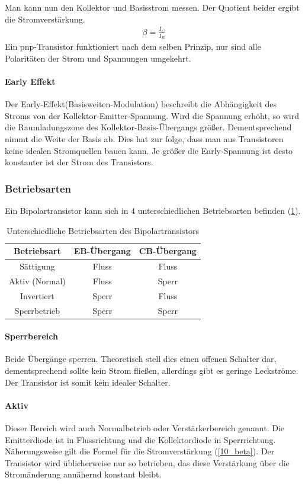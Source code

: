 	Man kann nun den Kollektor und Basisstrom messen. Der Quotient beider ergibt die Stromverstärkung.
	\begin{align}
		\beta = \frac{I_C}{I_B}
		\label{10_beta}
	\end{align}
	Ein pnp-Transistor funktioniert nach dem selben Prinzip, nur sind alle Polaritäten der Strom und Spannungen umgekehrt.
	
	\paragraph{Early Effekt} Der Early-Effekt(Basisweiten-Modulation) beschreibt die Abhängigkeit des Stroms von der Kollektor-Emitter-Spannung. Wird die Spannung erhöht, so wird die Raumladungszone des Kollektor-Basis-Übergangs größer. Dementsprechend nimmt die Weite der Basis ab. Dies hat zur folge, dass man aus Transistoren keine idealen Stromquellen bauen kann. Je größer die Early-Spannung ist desto konstanter ist der Strom des Transistors.
	
	\subsubsection{Betriebsarten}
	Ein Bipolartransistor kann sich in 4 unterschiedlichen Betriebsarten befinden (\ref{10_betriebsarten}).
	\begin{table}[h]
		\centering
		\begin{tabular}{c|c|c}
			Betriebsart& EB-Übergang &CB-Übergang\\
			\hline
			Sättigung & Fluss & Fluss\\
			Aktiv (Normal) & Fluss & Sperr\\
			Invertiert & Sperr & Fluss\\
			Sperrbetrieb & Sperr & Sperr
		\end{tabular}
		\caption{Unterschiedliche Betriebsarten des Bipolartransistors}
		\label{10_betriebsarten}
	\end{table}
	\paragraph{Sperrbereich} Beide Übergänge sperren. Theoretisch stell dies einen offenen Schalter dar, dementsprechend sollte kein Strom fließen, allerdings gibt es geringe Leckströme. Der Transistor ist somit kein idealer Schalter.
	\paragraph{Aktiv} Dieser Bereich wird auch Normalbetrieb oder Verstärkerbereich genannt. Die Emitterdiode ist in Flussrichtung und die Kollektordiode in Sperrrichtung. Näherungsweise gilt die Formel für die Stromverstärkung (\ref{10_beta}). Der Transistor wird üblicherweise nur so betrieben, das diese Verstärkung über die Stromänderung annähernd konstant bleibt. 
